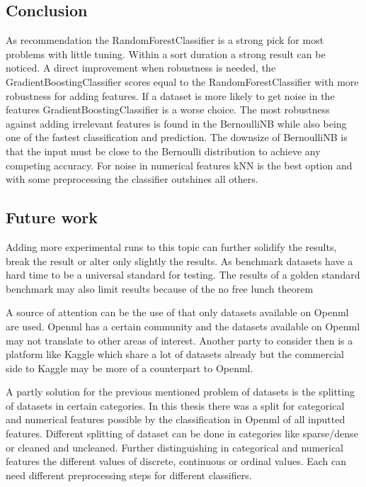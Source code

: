 \documentclass[a4paper,10pt]{article}
\begin{document}
\subsection{Conclusion}
As recommendation the RandomForestClassifier is a strong pick for most problems with little tuning. Within a sort duration a strong result can be noticed. A direct improvement when robustness is needed, the GradientBoostingClassifier scores equal to the RandomForestClassifier with more robustness for adding features. If a dataset is more likely to get noise in the features GradientBoostingClassifier is a worse choice. The most robustness against adding irrelevant features is found in the BernoulliNB while also being one of the fastest classification and prediction. The downsize of BernoulliNB is that the input must be close to the Bernoulli distribution to achieve any competing accuracy. For noise in numerical features kNN is the best option and with some preprocessing the classifier outshines all others. 



\subsection{Future work}
Adding more experimental runs to this topic can further solidify the results, break the result or alter only slightly the results. As benchmark datasets have a hard time to be a universal standard for testing. The results of a golden standard benchmark may also limit results because of the no free lunch theorem

A source of attention can be the use of that only datasets available on Openml are used. Openml has a certain community and the datasets available on Openml may not translate to other areas of interest. Another party to consider then is a platform like Kaggle which share a lot of datasets already but the commercial side to Kaggle may be more of a counterpart to Openml. 

A partly solution for the previous mentioned problem of datasets is the splitting of datasets in certain categories. In this thesis there was a split for categorical and numerical features possible by the classification in Openml of all inputted features. Different splitting of dataset can be done in categories like sparse/dense or cleaned and uncleaned. Further distinguishing in categorical and numerical features the different values of discrete, continuous or ordinal values. Each can need different preprocessing steps for different classifiers. 
\end{document}
